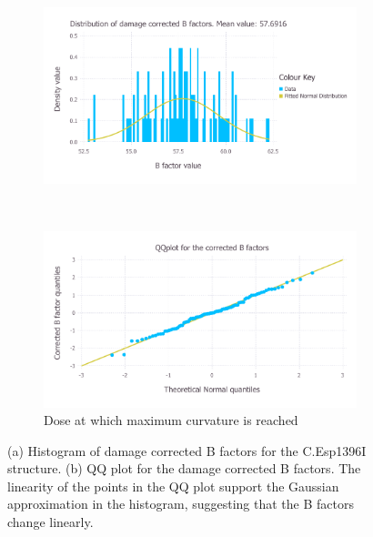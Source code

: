 \begin{figure}
    \centering
    \begin{subfigure}[b]{1.0\textwidth}
            \centering
            \includegraphics[width=\textwidth]{figures/datared/BFac_Distribution_cprot.pdf}
            \caption{}
            \label{fig:Damage corrected B factor distribution - C.Esp1396I}
    \end{subfigure}
    \\
    \begin{subfigure}[b]{1.0\textwidth}
            \centering
            \includegraphics[width=\textwidth]{figures/datared/BFac_QQplot_cprot.pdf}
            \caption{Dose at which maximum curvature is reached}
            \label{fig:B factor QQ plot - C.Esp1396I}
    \end{subfigure}
    \caption{(a) Histogram of damage corrected B factors for the C.Esp1396I structure.
    (b) QQ plot for the damage corrected B factors.
    The linearity of the points in the QQ plot support the Gaussian approximation in the histogram, suggesting that the B factors change linearly.}
    \label{fig:Gaussian B factor plots - C.Esp1396I}
\end{figure}

